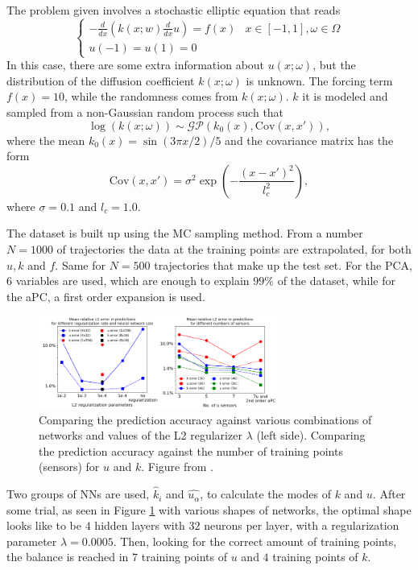 \documentclass[11pt,a4paper]{article}
\begin{document}
The problem given involves a stochastic elliptic equation that reads
\begin{equation}
    \begin{cases}
        \displaystyle -\frac{d}{dx} \left( k(x;w)\frac{d}{dx}u \right) = f(x) & x \in [-1,1], \omega \in \Omega \\
        u(-1) = u(1) = 0
    \end{cases}
    \label{inverse_pbl}
\end{equation}
In this case, there are some extra information about \(u(x;\omega)\), but the distribution of the diffusion coefficient \(k(x;\omega)\) is unknown. The forcing term \(f(x) = 10\), while the randomness comes from \(k(x;\omega)\). \(k\) it is modeled and sampled from a non-Gaussian random process such that 
\[
    \log(k(x;\omega)) \sim \mathcal{GP}(k_0(x), \text{Cov}(x, x')),
\]
where the mean \(k_0(x) = \sin({3\pi x}/2)/5\) and the covariance matrix has the form 
\[
    \text{Cov}(x, x') = \sigma^2 \exp\left( - \frac{(x-x')^2}{l_c^2} \right),
\]
where \(\sigma = 0.1\) and \(l_c= 1.0\).

The dataset is built up using the MC sampling method. From a number \(N = 1000\) of trajectories the data at the training points are extrapolated, for both \(u, k\) and \(f\). Same for \(N=500\) trajectories that make up the test set. For the PCA, 6 variables are used, which are enough to explain \(99\%\) of the dataset, while for the aPC, a first order expansion is used.
\begin{figure}[H]
    \centering 
    \includegraphics[width=0.7\textwidth]{Images/L2Error_inv_pbl.png}
    \captionsetup{justification=centering,margin=1cm}
    \caption{Comparing the prediction accuracy against various combinations of networks and values of the L2 regularizer \(\lambda\) (left side). Comparing the prediction accuracy against the number of training points (sensors) for \(u\) and \(k\). Figure from \cite{Zhang_2019}.}
    \label{fig:regularization}
\end{figure}
Two groups of NNs are used, \(\hat{k}_i\) and \(\hat{u_\alpha}\), to calculate the modes of \(k\) and \(u\). After some trial, as seen in Figure \ref{fig:regularization} with various shapes of networks, the optimal shape looks like to be \(4\) hidden layers with \(32\) neurons per layer, with a regularization parameter \(\lambda=0.0005\). Then, looking for the correct amount of training points, the balance is reached in \(7\) training points of \(u\) and \(4\) training points of \(k\).
\end{document}
